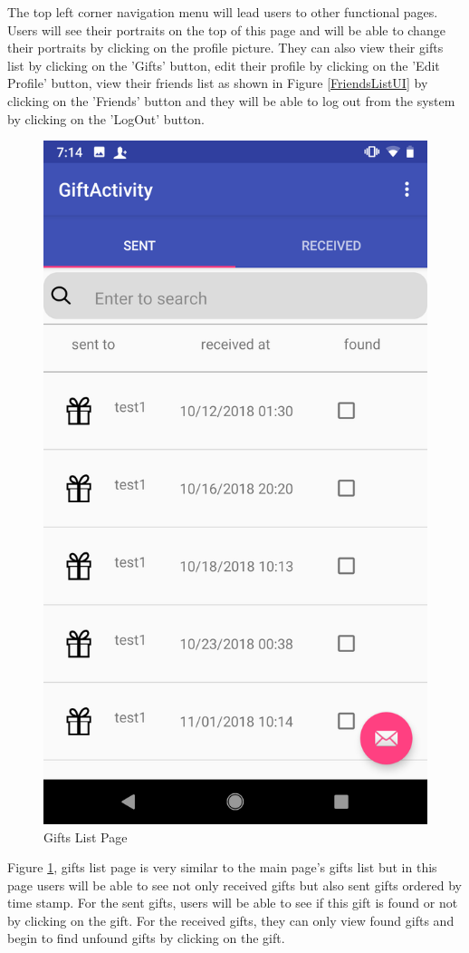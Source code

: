 \par The top left corner navigation menu will lead users to other functional pages. Users will see their portraits on the top of this page and will be able to change their portraits by clicking on the profile picture. They can also view their gifts list by clicking on the 'Gifts' button, edit their profile by clicking on the 'Edit Profile' button, view their friends list as shown in Figure \ref{FriendsListUI} by clicking on the 'Friends' button and they will be able to log out from the system by clicking on the 'LogOut' button. 

\begin{figure}[htb]
\centering
\includegraphics[width=.27\textwidth]{section03/assets/GiftsList.png}
\caption[Short Caption 2]{\label{GiftsListUI}Gifts List Page}
\end{figure}
\par Figure \ref{GiftsListUI}, gifts list page is very similar to the main page's gifts list but in this page users will be able to see not only received gifts but also sent gifts ordered by time stamp. For the sent gifts, users will be able to see if this gift is found or not by clicking on the gift. For the received gifts, they can only view found gifts and begin to find unfound gifts by clicking on the gift. 


